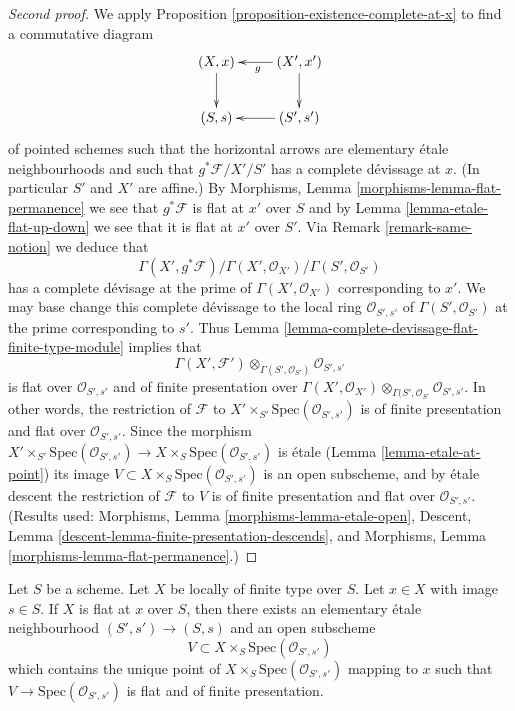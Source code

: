 \begin{proof}[Second proof]
We apply
Proposition \ref{proposition-existence-complete-at-x}
to find a commutative diagram
$$
\xymatrix{
(X, x) \ar[d] & (X', x') \ar[l]^g \ar[d] \\
(S, s) & (S', s') \ar[l]
}
$$
of pointed schemes such that the horizontal
arrows are elementary \'etale neighbourhoods
and such that $g^*\mathcal{F}/X'/S'$ has a complete
d\'evissage at $x$.
(In particular $S'$ and $X'$ are affine.) By
Morphisms, Lemma \ref{morphisms-lemma-flat-permanence}
we see that $g^*\mathcal{F}$ is flat at $x'$ over $S$ and by
Lemma \ref{lemma-etale-flat-up-down}
we see that it is flat at $x'$ over $S'$. Via
Remark \ref{remark-same-notion}
we deduce that
$$
\Gamma(X', g^*\mathcal{F})/
\Gamma(X', \mathcal{O}_{X'})/
\Gamma(S', \mathcal{O}_{S'})
$$
has a complete d\'evisage at the prime of $\Gamma(X', \mathcal{O}_{X'})$
corresponding to $x'$. We may base change this complete
d\'evissage to the local ring $\mathcal{O}_{S', s'}$
of $\Gamma(S', \mathcal{O}_{S'})$ at the prime corresponding to
$s'$. Thus
Lemma \ref{lemma-complete-devissage-flat-finite-type-module}
implies that
$$
\Gamma(X', \mathcal{F}')
\otimes_{\Gamma(S', \mathcal{O}_{S'})}
\mathcal{O}_{S', s'}
$$
is flat over $\mathcal{O}_{S', s'}$ and of finite presentation over
$\Gamma(X', \mathcal{O}_{X'})
\otimes_{\Gamma(S', \mathcal{O}_{S'}} \mathcal{O}_{S', s'}$.
In other words, the restriction of $\mathcal{F}$ to
$X' \times_{S'} \text{Spec}(\mathcal{O}_{S', s'})$
is of finite presentation and flat over $\mathcal{O}_{S', s'}$.
Since the morphism
$X' \times_{S'} \text{Spec}(\mathcal{O}_{S', s'})
\to X \times_S \text{Spec}(\mathcal{O}_{S', s'})$
is \'etale
(Lemma \ref{lemma-etale-at-point})
its image $V \subset X \times_S \text{Spec}(\mathcal{O}_{S', s'})$
is an open subscheme, and by \'etale descent the restriction
of $\mathcal{F}$ to $V$ is of finite presentation and flat over
$\mathcal{O}_{S', s'}$. (Results used:
Morphisms, Lemma \ref{morphisms-lemma-etale-open},
Descent, Lemma \ref{descent-lemma-finite-presentation-descends}, and
Morphisms, Lemma \ref{morphisms-lemma-flat-permanence}.)
\end{proof}

\begin{lemma}
\label{lemma-finite-type-flat-at-point-X}
Let $S$ be a scheme. Let $X$ be locally of finite type over $S$.
Let $x \in X$ with image $s \in S$.
If $X$ is flat at $x$ over $S$, then there exists an elementary
\'etale neighbourhood $(S', s') \to (S, s)$ and an open subscheme
$$
V \subset X \times_S \text{Spec}(\mathcal{O}_{S', s'})
$$
which contains the unique point of
$X \times_S \text{Spec}(\mathcal{O}_{S', s'})$ mapping to $x$
such that $V \to \text{Spec}(\mathcal{O}_{S', s'})$
is flat and of finite presentation.
\end{lemma}

